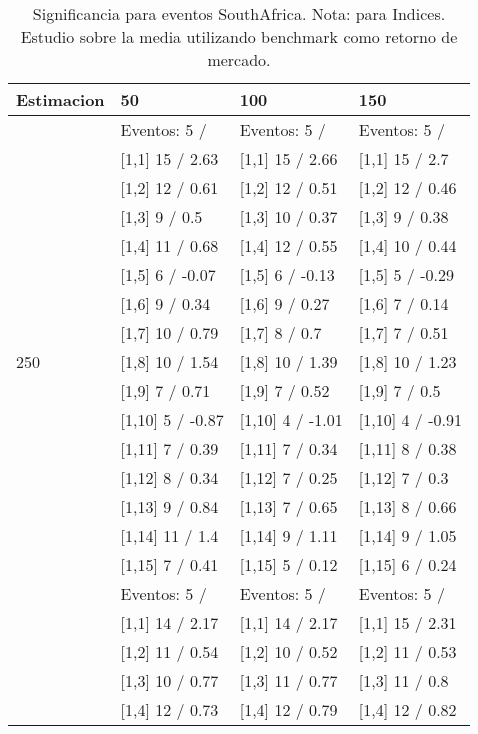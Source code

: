 \begin{table}

\caption{Significancia para eventos SouthAfrica. Nota: para Indices. Estudio sobre la media utilizando benchmark como retorno de mercado.}
\centering
\begin{tabular}[t]{llll}
\toprule
Estimacion & 50 & 100 & 150\\
\midrule
 & Eventos:  5 / & Eventos:  5 / & Eventos:  5 /\\
 & {}[1,1] 15  / 2.63 & {}[1,1] 15  / 2.66 & {}[1,1] 15  / 2.7\\
 & {}[1,2] 12  / 0.61 & {}[1,2] 12  / 0.51 & {}[1,2] 12  / 0.46\\
 & {}[1,3] 9  / 0.5 & {}[1,3] 10  / 0.37 & {}[1,3] 9  / 0.38\\
 & {}[1,4] 11  / 0.68 & {}[1,4] 12  / 0.55 & {}[1,4] 10  / 0.44\\
\addlinespace
 & {}[1,5] 6  / -0.07 & {}[1,5] 6  / -0.13 & {}[1,5] 5  / -0.29\\
 & {}[1,6] 9  / 0.34 & {}[1,6] 9  / 0.27 & {}[1,6] 7  / 0.14\\
 & {}[1,7] 10  / 0.79 & {}[1,7] 8  / 0.7 & {}[1,7] 7  / 0.51\\
250 & {}[1,8] 10  / 1.54 & {}[1,8] 10  / 1.39 & {}[1,8] 10  / 1.23\\
 & {}[1,9] 7  / 0.71 & {}[1,9] 7  / 0.52 & {}[1,9] 7  / 0.5\\
\addlinespace
 & {}[1,10] 5  / -0.87 & {}[1,10] 4  / -1.01 & {}[1,10] 4  / -0.91\\
 & {}[1,11] 7  / 0.39 & {}[1,11] 7  / 0.34 & {}[1,11] 8  / 0.38\\
 & {}[1,12] 8  / 0.34 & {}[1,12] 7  / 0.25 & {}[1,12] 7  / 0.3\\
 & {}[1,13] 9  / 0.84 & {}[1,13] 7  / 0.65 & {}[1,13] 8  / 0.66\\
 & {}[1,14] 11  / 1.4 & {}[1,14] 9  / 1.11 & {}[1,14] 9  / 1.05\\
\addlinespace
 & {}[1,15] 7  / 0.41 & {}[1,15] 5  / 0.12 & {}[1,15] 6  / 0.24\\
 & Eventos:  5 / & Eventos:  5 / & Eventos:  5 /\\
 & {}[1,1] 14  / 2.17 & {}[1,1] 14  / 2.17 & {}[1,1] 15  / 2.31\\
 & {}[1,2] 11  / 0.54 & {}[1,2] 10  / 0.52 & {}[1,2] 11  / 0.53\\
 & {}[1,3] 10  / 0.77 & {}[1,3] 11  / 0.77 & {}[1,3] 11  / 0.8\\
\addlinespace
 & {}[1,4] 12  / 0.73 & {}[1,4] 12  / 0.79 & {}[1,4] 12  / 0.82\\

\end{tabular}
\end{table}
